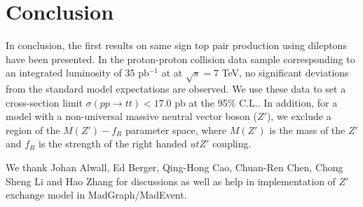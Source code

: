 \section{Conclusion}
\label{sec:conclusion}
In conclusion, the first results on same sign top pair production using 
dileptons have been presented. 
In the proton-proton collision data sample corresponding to an 
integrated luminosity of 35 pb$^{-1}$ at at $\sqrt{s} = 7 $ TeV, 
no significant deviations from the standard model expectations are observed. 
We use these data to set a cross-section limit $\sigma(pp \to tt) < 17.0$ pb at the 95\% C.L..
In addition, for a model with a non-universal massive neutral vector boson ($Z'$), we exclude 
a region of the $M(Z')-f_R$ parameter space, where $M(Z')$ is the mass of the $Z'$ 
and $f_R$ is the strength of the right handed $utZ'$ coupling.



\ack

We thank Johan Alwall, Ed Berger, Qing-Hong Cao, Chuan-Ren Chen, Chong Sheng Li and Hao Zhang for 
discussions as well as help in implementation of $Z'$ exchange model in MadGraph/MadEvent. 


